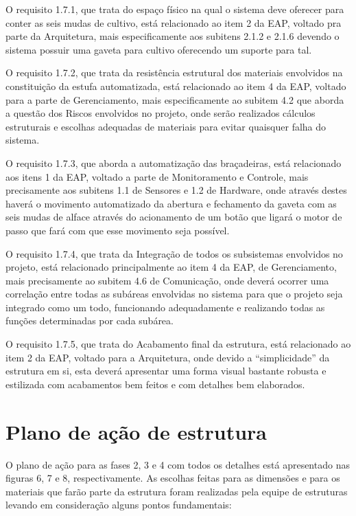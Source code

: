 O requisito 1.7.1, que trata do espaço físico na qual o sistema deve oferecer para conter as seis mudas de cultivo, está relacionado  ao item 2 da EAP, voltado pra parte da Arquitetura, mais especificamente aos subitens 2.1.2 e 2.1.6 devendo o sistema possuir uma gaveta para cultivo oferecendo um suporte para tal.

O requisito 1.7.2, que trata da resistência estrutural dos materiais envolvidos na constituição da estufa automatizada, está relacionado ao item 4 da EAP, voltado para a parte de Gerenciamento, mais especificamente ao subitem 4.2 que aborda a questão dos Riscos envolvidos no projeto, onde serão realizados cálculos estruturais e escolhas adequadas de materiais para evitar quaisquer falha do sistema.

O requisito 1.7.3, que aborda a automatização das braçadeiras, está relacionado aos itens 1 da EAP, voltado a parte de Monitoramento e Controle, mais precisamente aos subitens 1.1 de Sensores e 1.2 de Hardware, onde através destes haverá o movimento automatizado da abertura e fechamento da gaveta com as seis mudas de alface através do acionamento de um botão que ligará o motor de passo que fará com que esse movimento seja possível.

O requisito 1.7.4, que trata da Integração de todos os subsistemas envolvidos no projeto, está relacionado principalmente ao item 4 da EAP, de Gerenciamento, mais precisamente ao subitem 4.6 de Comunicação, onde deverá ocorrer uma correlação entre todas as subáreas envolvidas no sistema para que o projeto seja integrado como um todo, funcionando adequadamente e realizando todas as funções determinadas por cada subárea.

O requisito 1.7.5, que trata do Acabamento final da estrutura, está relacionado ao item 2 da EAP, voltado para a Arquitetura, onde devido a “simplicidade” da estrutura em si, esta deverá apresentar uma forma visual bastante robusta e estilizada com acabamentos bem feitos e com detalhes bem elaborados.

\section{Plano de ação de estrutura}

O plano de ação para as fases 2, 3 e 4 com todos os detalhes está apresentado nas figuras 6, 7 e 8, respectivamente. As escolhas feitas para as dimensões e para os materiais que farão parte da estrutura foram realizadas pela equipe de estruturas levando em consideração alguns pontos fundamentais:

